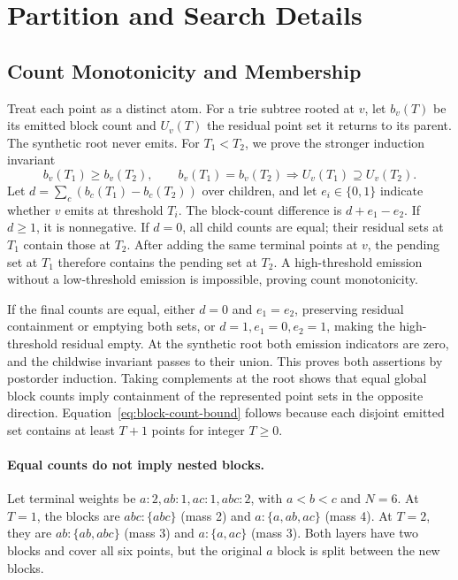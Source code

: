 \section{Partition and Search Details}
\label{sec:structural-details}
\subsection{Count Monotonicity and Membership}
\label{sec:partition-properties}
Treat each point as a distinct atom. For a trie subtree rooted at $v$, let
$b_v(T)$ be its emitted block count and $U_v(T)$ the residual point set it
returns to its parent. The synthetic root never emits. For $T_1<T_2$, we
prove the stronger induction invariant
\begin{equation}
 b_v(T_1)\ge b_v(T_2),\qquad
 b_v(T_1)=b_v(T_2)\Longrightarrow U_v(T_1)\supseteq U_v(T_2).
\end{equation}
Let $d=\sum_c(b_c(T_1)-b_c(T_2))$ over children, and let $e_i\in\{0,1\}$
indicate whether $v$ emits at threshold $T_i$. The block-count difference
is $d+e_1-e_2$. If $d\ge1$, it is nonnegative. If $d=0$, all child counts
are equal; their residual sets at $T_1$ contain those at $T_2$. After adding
the same terminal points at $v$, the pending set at $T_1$ therefore contains
the pending set at $T_2$. A high-threshold emission without a low-threshold
emission is impossible, proving count monotonicity.

If the final counts are equal, either $d=0$ and $e_1=e_2$, preserving residual
containment or emptying both sets, or $d=1,e_1=0,e_2=1$, making the
high-threshold residual empty. At the synthetic root both emission indicators
are zero, and the childwise invariant passes to their union. This proves
both assertions by postorder induction. Taking complements at the root shows
that equal global block counts imply containment of the represented point
sets in the opposite direction. Equation~\ref{eq:block-count-bound} follows
because each disjoint emitted set contains at least $T+1$ points for integer $T\ge0$.

\paragraph{Equal counts do not imply nested blocks.}
Let terminal weights be $a:2,ab:1,ac:1,abc:2$, with $a<b<c$ and $N=6$.
At $T=1$, the blocks are $abc:\{abc\}$ (mass 2) and
$a:\{a,ab,ac\}$ (mass 4). At $T=2$, they are
$ab:\{ab,abc\}$ (mass 3) and $a:\{a,ac\}$ (mass 3).
Both layers have two blocks and cover all six points, but the original
$a$ block is split between the new blocks.

